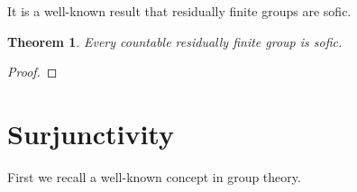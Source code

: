 \documentclass[titlepage, a4paper]{article}
\newcommand{\Z}{\mathbb{Z}}
\DeclareMathOperator{\sym}{Sym}
\theoremstyle{theoremdd}
\newtheorem{theorem}{Theorem}[section]
\theoremstyle{definitiondd}
\theoremstyle{remarkdd}
\begin{document}
It is a well-known result that residually finite groups are sofic. %

    \begin{theorem} \label{thm:res_fin_sofic}
        Every countable residually finite group is sofic.
    \end{theorem}
    \begin{proof}
        
    \end{proof}




 

    \section{Surjunctivity}\label{sec:surjunctivity}

    First we recall a well-known concept in group theory.
\end{document}
